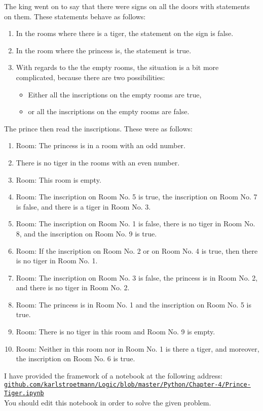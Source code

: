 The king went on to say that there were signs on all the doors with statements on them. These statements behave as follows:
\begin{enumerate}
\item In the rooms where there is a tiger, the statement on the sign is false.
\item In the room where the princess is, the statement is true.
\item With regards to the the empty rooms, the situation is a bit more
      complicated, because there are two possibilities:
      \begin{itemize}
      \item Either all the inscriptions on the empty rooms are true,
      \item or all the inscriptions on the empty rooms are false.
      \end{itemize}

\end{enumerate}
The prince then read the inscriptions. These were as follows:
\begin{enumerate}
\item Room: The princess is in a room with an odd number.
\item There is no tiger in the rooms with an even number.
\item Room: This room is empty.
\item Room: The inscription on Room No. 5 is true, the inscription on Room No. 7 is false,
      and there is a tiger in Room No. 3.
\item Room: The inscription on Room No. 1 is false, there is no tiger in Room No. 8,
      and the inscription on Room No. 9 is true.
\item Room: If the inscription on Room No. 2 or on Room No. 4 is true,
      then there is no tiger in Room No. 1.
\item Room: The inscription on Room No. 3 is false, the princess is in Room No. 2,
      and there is no tiger in Room No. 2.
\item Room: The princess is in Room No. 1 and the inscription on Room No. 5 is true.
\item Room: There is no tiger in this room and Room No. 9 is empty.
\item Room: Neither in this room nor in Room No. 1 is there a tiger, and moreover, the
      inscription on Room No. 6 is true.
\end{enumerate} 
I have provided the framework of a notebook at the following address:
\\[0.2cm]
\hspace*{1.3cm}
\href{https://github.com/karlstroetmann/Logic/blob/master/Python/Chapter-4/Prince-Tiger.ipynb}{\texttt{github.com/karlstroetmann/Logic/blob/master/Python/Chapter-4/Prince-Tiger.ipynb}}
\\[0.2cm]
You should edit this notebook in order to solve the given problem.

